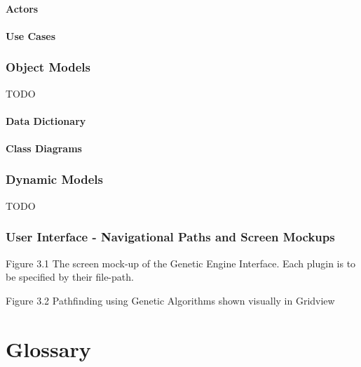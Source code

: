 \paragraph{Actors}
\paragraph{Use Cases}

\subsubsection{Object Models}
TODO
\paragraph{Data Dictionary}
\paragraph{Class Diagrams}

\subsubsection{Dynamic Models}
TODO
\subsubsection{User Interface - Navigational Paths and Screen Mockups}

Figure 3.1 The screen mock-up of the Genetic Engine Interface. Each plugin is to be specified by their file-path.

Figure 3.2 Pathfinding using Genetic Algorithms shown visually in Gridview 

%
%
\section{Glossary}




